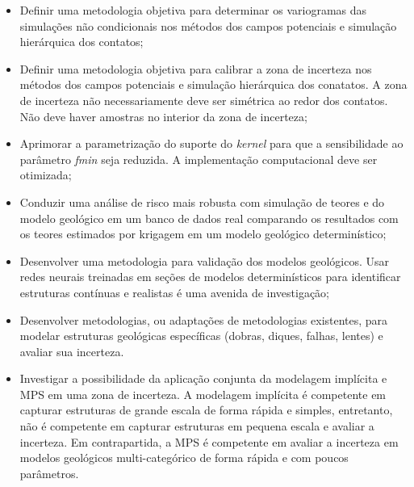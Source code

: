  \begin{itemize}
    \item Definir uma metodologia objetiva para determinar os variogramas das simulações não condicionais nos métodos dos campos potenciais e simulação hierárquica dos contatos;
    \item Definir uma metodologia objetiva para calibrar a zona de incerteza nos métodos dos campos potenciais e simulação hierárquica dos conatatos. A zona de incerteza não necessariamente deve ser simétrica ao redor dos contatos. Não deve haver amostras no interior da zona de incerteza;
    \item Aprimorar a parametrização do suporte do \textit{kernel} para que a sensibilidade ao parâmetro \textit{fmin} seja reduzida. A implementação computacional deve ser otimizada;
    \item Conduzir uma análise de risco mais robusta com simulação de teores e do modelo geológico em um banco de dados real comparando os resultados com os teores estimados por krigagem em um modelo geológico determinístico;
    \item Desenvolver uma metodologia para validação dos modelos geológicos. Usar redes neurais treinadas em seções de modelos determinísticos para identificar estruturas contínuas e realistas é uma avenida de investigação;
    \item Desenvolver metodologias, ou adaptações de metodologias existentes, para modelar estruturas geológicas específicas (dobras, diques, falhas, lentes) e avaliar sua incerteza.
    \item Investigar a possibilidade da aplicação conjunta da modelagem implícita e MPS em uma zona de incerteza. A modelagem implícita é competente em capturar estruturas de grande escala de forma rápida e simples, entretanto, não é competente em capturar estruturas em pequena escala e avaliar a incerteza. Em contrapartida, a MPS é competente em avaliar a incerteza em modelos geológicos multi-categórico de forma rápida e com poucos parâmetros.
 \end{itemize}
